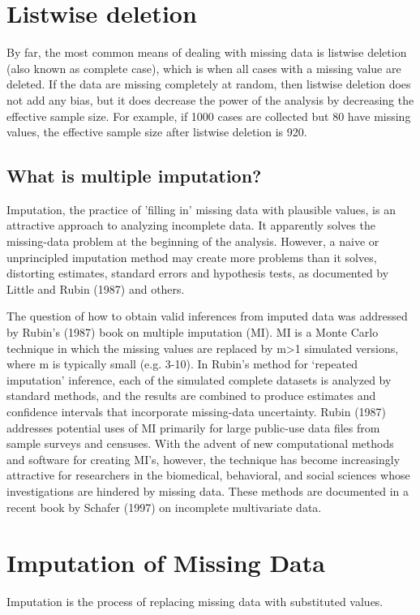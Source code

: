 \documentclass[a4paper,12pt]{article}
\begin{document}
\section{Listwise deletion}
By far, the most common means of dealing with missing data is listwise deletion (also known as complete case), which is when all cases with a missing value are deleted. If the data are missing completely at random, then listwise deletion does not add any bias, but it does decrease the power of the analysis by decreasing the effective sample size. For example, if 1000 cases are collected but 80 have missing values, the effective sample size after listwise deletion is 920. 
\subsection{What is multiple imputation?}

Imputation, the practice of 'filling in' missing data with plausible values, is an attractive approach to analyzing incomplete data. It apparently solves the missing-data problem at the beginning of the analysis. However, a naive or unprincipled imputation method may create more problems than it solves, distorting estimates, standard errors and hypothesis tests, as documented by Little and Rubin (1987) and others.

The question of how to obtain valid inferences from imputed data was addressed by Rubin's (1987) book on multiple imputation (MI). MI is a Monte Carlo technique in which the missing values are replaced by m>1 simulated versions, where m is typically small (e.g. 3-10). 
In Rubin's method for `repeated imputation' inference, each of the simulated complete datasets is analyzed by standard methods, and the results are combined to produce estimates and confidence intervals that incorporate missing-data uncertainty. Rubin (1987) addresses potential uses of MI primarily for large public-use data files from sample surveys and censuses. With the advent of new computational methods and software for creating MI's, however, the technique has become increasingly attractive for researchers in the biomedical, behavioral, and social sciences whose investigations are hindered by missing data. These methods are documented in a recent book by Schafer (1997) on incomplete multivariate data.
\section{Imputation of Missing Data}	
Imputation is the process of replacing missing data with substituted values.
\end{document}
